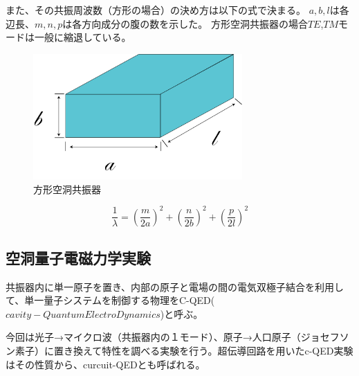 また、その共振周波数（方形の場合）の決め方は以下の式で決まる。
$a,b,l$は各辺長、$m,n,p$は各方向成分の腹の数を示した。
方形空洞共振器の場合$TE$,$TM$モードは一般に縮退している。

\vspace{10 mm}

\begin{figure}[h]
  \begin{center}
    \includegraphics[width=8cm]{./image/空洞共振器.png}
    \caption{方形空洞共振器}
    \label{fig:Cavity}
  \end{center}
\end{figure}

\[
 \frac{1}{\lambda} = (\frac{m}{2a})^2 + (\frac{n}{2b})^2 + (\frac{p}{2l})^2
\]

\subsection*{空洞量子電磁力学実験}
共振器内に単一原子を置き、内部の原子と電場の間の電気双極子結合を利用して、単一量子システムを制御する物理をC-QED($cavity - Quantum ElectroDynamics$)と呼ぶ。

今回は光子→マイクロ波（共振器内の１モード）、原子→人口原子（ジョセフソン素子）に置き換えて特性を調べる実験を行う。超伝導回路を用いたc-QED実験はその性質から、curcuit-QEDとも呼ばれる。

